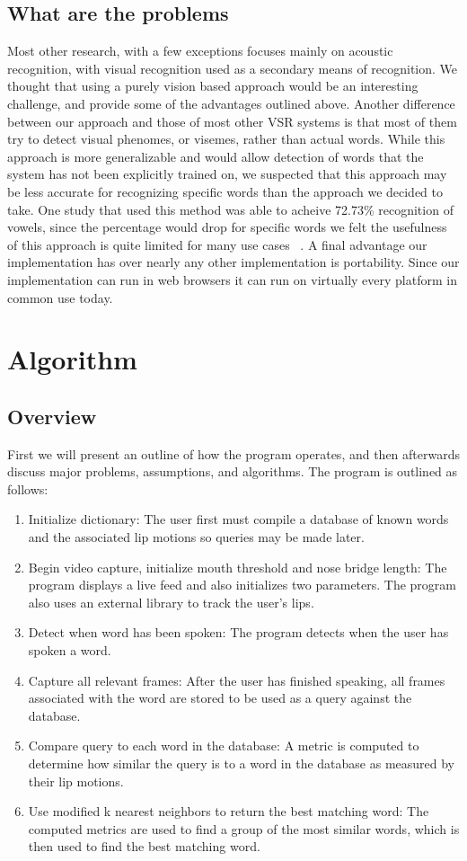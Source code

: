 \documentclass[10pt,twocolumn,letterpaper]{article}
\begin{document}
\subsection{What are the problems}
Most other research, with a few exceptions focuses mainly on acoustic recognition, with visual recognition used as a secondary means of recognition. We thought that using a purely vision based approach would be an interesting challenge, and provide some of the advantages outlined above.
Another difference between our approach and those of most other VSR systems is that most of them try to detect visual phenomes, or visemes, rather than actual words.
While this approach is more generalizable and would allow detection of words that the system has not been explicitly trained on, we suspected that this approach may be less accurate for recognizing specific words than the approach we decided to take.
One study that used this method was able to acheive 72.73\% recognition of vowels, since the percentage would drop for specific words we felt the usefulness of this approach is quite limited for many use cases ~\cite{Viseme}.
A final advantage our implementation has over nearly any other implementation is portability. Since our implementation can run in web browsers it can run on virtually every platform in common use today.


\section{Algorithm}
\subsection{Overview}
First we will present an outline of how the program operates, and then afterwards discuss major problems, assumptions, and algorithms. The program is outlined as follows:
\begin{enumerate}
\item Initialize dictionary: The user first must compile a database of known words and the associated lip motions so queries may be made later.
\item Begin video capture, initialize mouth threshold and nose bridge length: The program displays a live feed and also initializes two parameters. The program also uses an external library to track the user’s lips.
\item Detect when word has been spoken: The program detects when the user has spoken a word.
\item Capture all relevant frames: After the user has finished speaking, all frames associated with the word are stored to be used as a query against the database.
\item Compare query to each word in the database: A metric is computed to determine how similar the query is to a word in the database as measured by their lip motions.
\item Use modified k nearest neighbors to return the best matching word: The computed metrics are used to find a group of the most similar words, which is then used to find the best matching word.
\end{enumerate}
\end{document}
